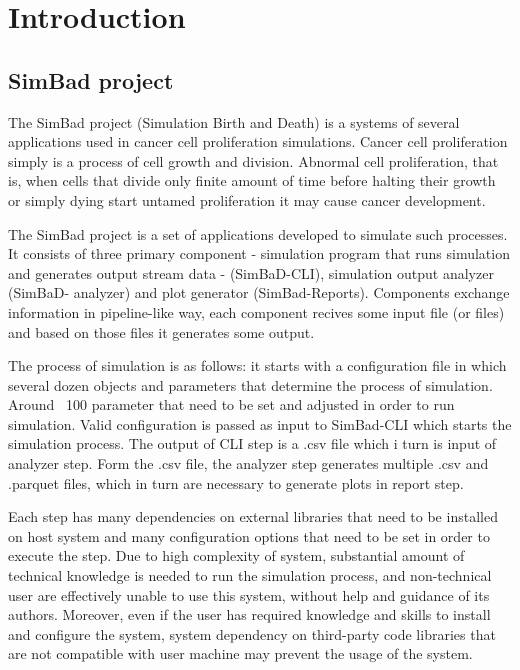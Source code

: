 \chapter{Introduction}
\section{SimBad project}
The SimBad project (Simulation Birth and Death) is a systems of several applications used in cancer cell proliferation simulations. Cancer cell proliferation simply is a  process of cell growth and division. Abnormal cell proliferation, that is, when  cells that divide only finite amount of time before halting their growth or simply dying start untamed proliferation it may cause cancer development.

The SimBad project is a set of applications developed to simulate such processes. It consists of three primary component - simulation program that runs simulation and generates output stream data - (SimBaD-CLI), simulation output analyzer (SimBaD- analyzer) and plot generator (SimBad-Reports). Components exchange information in pipeline-like way, each component recives some input file (or files) and based on those files it generates some output.

The process of simulation is as follows: it starts with a configuration file in which several dozen objects and parameters that determine the process of simulation. Around ~100 parameter that need to be set and adjusted in order to run simulation. Valid configuration is passed as input to SimBad-CLI which starts the simulation process. The output of CLI step is a .csv file which i turn is input of analyzer step. Form the .csv file, the analyzer step generates multiple .csv and .parquet files, which in turn are necessary to generate plots
in report step.

Each step has many dependencies on external libraries that need to be installed on host system and many configuration options that need to be set in order to execute the step. Due to high complexity of system, substantial amount of technical knowledge is needed to run the simulation process, and non-technical user are effectively unable to use this system, without help and guidance of its authors. Moreover, even if the user has required knowledge and skills to install and configure the system, system dependency on third-party code libraries that are not compatible with user machine may prevent the usage of the system.

